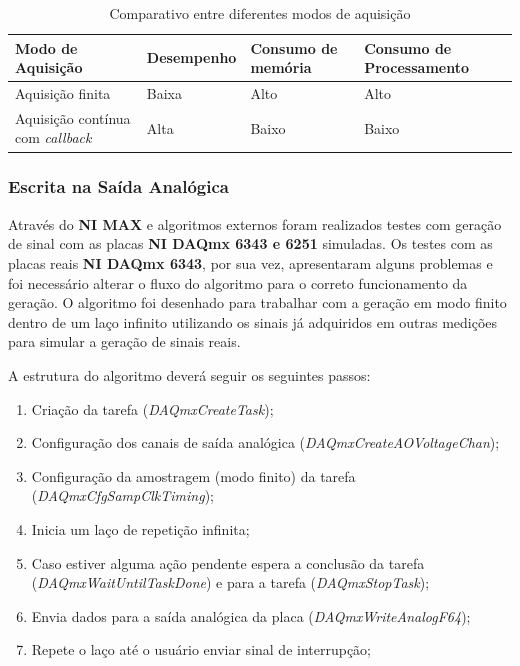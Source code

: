 \documentclass{ufscThesis}
\begin{document}
\begin{table}[htbp]
  \centering
  \begin{footnotesize}
    \begin{tabular}{|p{3cm}|p{2cm}|p{2cm}|p{2cm}|}
      \textbf{Modo de Aquisição} & \textbf{Desempenho} & \textbf{Consumo de memória} & \textbf{Consumo de Processamento} \\ \hline
       Aquisição finita & Baixa & Alto & Alto \\ \hline
       Aquisição contínua com \textit{callback} & Alta & Baixo & Baixo\\ \hline
    \end{tabular}
  \end{footnotesize} 
  \caption{Comparativo entre diferentes modos de aquisição}
  \label{tab:comparativo-aquisição}
\end{table} 


\subsubsection{Escrita na Saída Analógica}
Através do \textbf{NI MAX} e algoritmos externos foram realizados testes com geração de sinal com as placas \textbf{NI DAQmx 6343 e 6251} simuladas. Os testes com as placas reais \textbf{NI DAQmx 6343}, por sua vez, apresentaram alguns problemas e foi necessário alterar o fluxo do algoritmo para o correto funcionamento da geração. O algoritmo foi desenhado para trabalhar com a geração em modo finito dentro de um laço infinito utilizando os sinais já adquiridos em outras medições para simular a geração de sinais reais.

A estrutura do algoritmo deverá seguir os seguintes passos:

\begin{enumerate}
  \item Criação da tarefa (\textit{DAQmxCreateTask});
  \item Configuração dos canais de saída analógica (\textit{DAQmxCreateAOVoltageChan});
  \item Configuração da amostragem (modo finito) da tarefa (\textit{DAQmxCfgSampClkTiming});
  \item Inicia um laço de repetição infinita;
  \item Caso estiver alguma ação pendente espera a conclusão da tarefa (\textit{DAQmxWaitUntilTaskDone}) e para a tarefa (\textit{DAQmxStopTask});
  \item Envia dados para a saída analógica da placa (\textit{DAQmxWriteAnalogF64});
  \item Repete o laço até o usuário enviar sinal de interrupção;
\end{enumerate}
\end{document}
